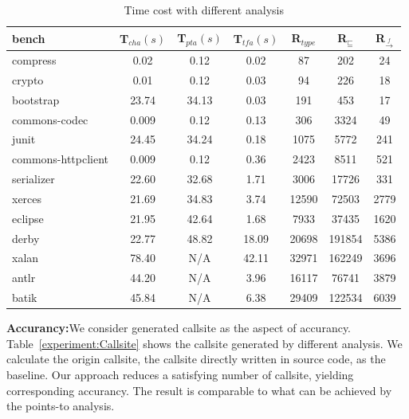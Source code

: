 \documentclass{llncs}
\newcommand{\less}{\sqsubseteq}
\newcommand{\hflow}{\longrightarrow}
\newcommand{\lhflow}[1]{\stackrel{#1}{\hflow}}
\begin{document}
\begin{table}[!htbp]\centering
\caption{Time cost with different analysis}
\begin{tabular}{lcccccc}
	\hline
	\textbf{bench} & \textbf{T$_{cha}(s)$} & \textbf{T$_{pta}(s)$} & \textbf{T$_{tfa}(s)$} & \textbf{R$_{type}$} & \textbf{R$_{\less}$} & \textbf{R$_{\lhflow{f}}$} \\
	\hline
	compress & 0.02 & 0.12 & 0.02 & 87 & 202 & 24\\
	crypto & 0.01 & 0.12 & 0.03 & 94 & 226 & 18\\
	bootstrap & 23.74 & 34.13 & 0.03 & 191 & 453 & 17\\
	commons-codec & 0.009 & 0.12 & 0.13 & 306 & 3324 & 49\\
	junit & 24.45 & 34.24 & 0.18 & 1075 & 5772 & 241\\
	commons-httpclient & 0.009 & 0.12 & 0.36 & 2423 & 8511 & 521 \\
	serializer & 22.60 & 32.68 & 1.71 & 3006 & 17726 & 331\\
	xerces & 21.69 & 34.83 & 3.74 & 12590 & 72503 & 2779\\
	eclipse & 21.95 & 42.64 & 1.68 & 7933 & 37435 & 1620\\
	derby & 22.77 & 48.82 & 18.09 & 20698 & 191854 & 5386\\
	xalan & 78.40 & N/A & 42.11 & 32971 & 162249 & 3696\\
	antlr & 44.20 & N/A & 3.96 & 16117 & 76741 & 3879\\
	batik & 45.84 & N/A & 6.38 & 29409 & 122534 & 6039 \\
	\hline
\end{tabular}
\label{experiment:Time Cost}
\end{table}

\textbf{Accurancy:}We consider generated callsite as the aspect of accurancy. Table~\ref{experiment:Callsite} shows the callsite generated by different analysis. We calculate the origin callsite, the callsite directly written in source code, as the baseline. Our approach reduces a satisfying number of callsite, yielding corresponding accurancy. The result is comparable to what can be achieved by the points-to analysis.
\end{document}
